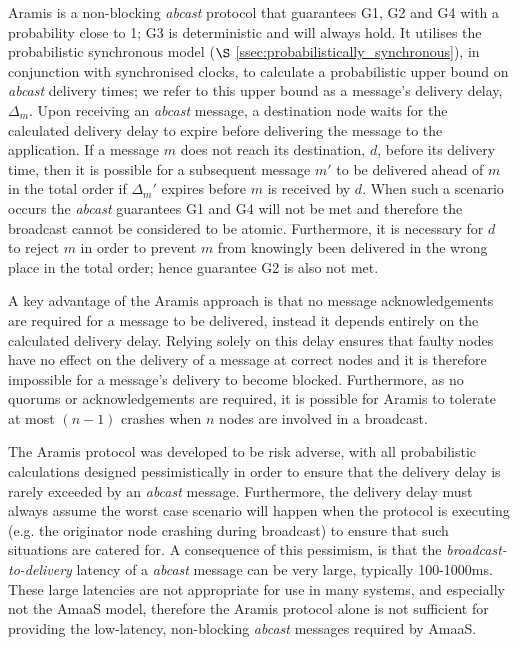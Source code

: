     \textsf{Aramis} is a non-blocking \emph{abcast} protocol that guarantees G1, G2 and G4 with a probability close to 1; G3 is deterministic and will always hold.  It utilises the probabilistic synchronous model ($\S$ \ref{ssec:probabilistically_synchronous}), in conjunction with synchronised clocks, to calculate a probabilistic upper bound on \emph{abcast} delivery times; we refer to this upper bound as a message's delivery delay, $\Delta_m$.  Upon receiving an \emph{abcast} message, a destination node waits for the calculated delivery delay to expire before delivering the message to the application.  If a message $m$ does not reach its destination, $d$, before its delivery time, then it is possible for a subsequent message $m'$ to be delivered ahead of $m$ in the total order if $\Delta_m'$ expires before $m$ is received by $d$.  When such a scenario occurs the \emph{abcast} guarantees G1 and G4 will not be met and therefore the broadcast cannot be considered to be atomic.  Furthermore, it is necessary for $d$ to reject $m$ in order to prevent $m$ from knowingly been delivered in the wrong place in the total order; hence guarantee G2 is also not met.  
    
    A key advantage of the \textsf{Aramis} approach is that no message acknowledgements are required for a message to be delivered, instead it depends entirely on the calculated delivery delay.  Relying solely on this delay ensures that faulty nodes have no effect on the delivery of a message at correct nodes and it is therefore impossible for a message's delivery to become blocked.  Furthermore, as no quorums or acknowledgements are required, it is possible for  \textsf{Aramis} to tolerate at most $(n - 1)$ crashes when $n$ nodes are involved in a broadcast.  
    
    The \textsf{Aramis} protocol was developed to be risk adverse, with all probabilistic calculations designed pessimistically in order to ensure that the delivery delay is rarely exceeded by an \emph{abcast} message.  Furthermore, the delivery delay must always assume the worst case scenario will happen when the protocol is executing (e.g. the originator node crashing during broadcast) to ensure that such situations are catered for.  A consequence of this pessimism, is that the \emph{broadcast-to-delivery} latency of a \emph{abcast} message can be very large, typically 100-1000ms.  These large latencies are not appropriate for use in many systems, and especially not the \textsf{AmaaS} model, therefore the \textsf{Aramis} protocol alone is not sufficient for providing the low-latency, non-blocking \emph{abcast} messages required by \textsf{AmaaS}.  
    
